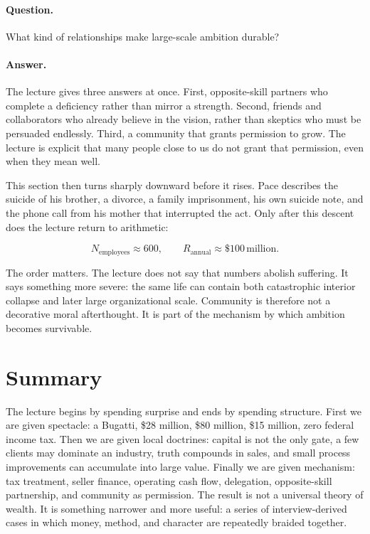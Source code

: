 \paragraph{Question.} What kind of relationships make large-scale ambition durable?

\paragraph{Answer.} The lecture gives three answers at once. First, opposite-skill partners who complete a deficiency rather than mirror a strength. Second, friends and collaborators who already believe in the vision, rather than skeptics who must be persuaded endlessly. Third, a community that grants permission to grow. The lecture is explicit that many people close to us do not grant that permission, even when they mean well.

This section then turns sharply downward before it rises. Pace describes the suicide of his brother, a divorce, a family imprisonment, his own suicide note, and the phone call from his mother that interrupted the act. Only after this descent does the lecture return to arithmetic:

\begin{equation}
N_{\text{employees}}\approx 600,
\qquad
R_{\text{annual}}\approx \$100\,\text{million}.
\end{equation}

The order matters. The lecture does not say that numbers abolish suffering. It says something more severe: the same life can contain both catastrophic interior collapse and later large organizational scale. Community is therefore not a decorative moral afterthought. It is part of the mechanism by which ambition becomes survivable.

\section{Summary}

The lecture begins by spending surprise and ends by spending structure. First we are given spectacle: a Bugatti, \$28 million, \$80 million, \$15 million, zero federal income tax. Then we are given local doctrines: capital is not the only gate, a few clients may dominate an industry, truth compounds in sales, and small process improvements can accumulate into large value. Finally we are given mechanism: tax treatment, seller finance, operating cash flow, delegation, opposite-skill partnership, and community as permission. The result is not a universal theory of wealth. It is something narrower and more useful: a series of interview-derived cases in which money, method, and character are repeatedly braided together.